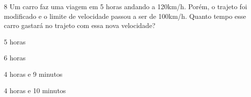 

\num{8} Um carro faz uma viagem em 5 horas andando a 120km/h. Porém, o
trajeto foi modificado e o limite de velocidade passou a ser de 100km/h.
Quanto tempo esse carro gastará no trajeto com essa nova velocidade?

\begin{escolha}
\item 5 horas
\item 6 horas
\item 4 horas e 9 minutos
\item 4 horas e 10 minutos
\end{escolha}




